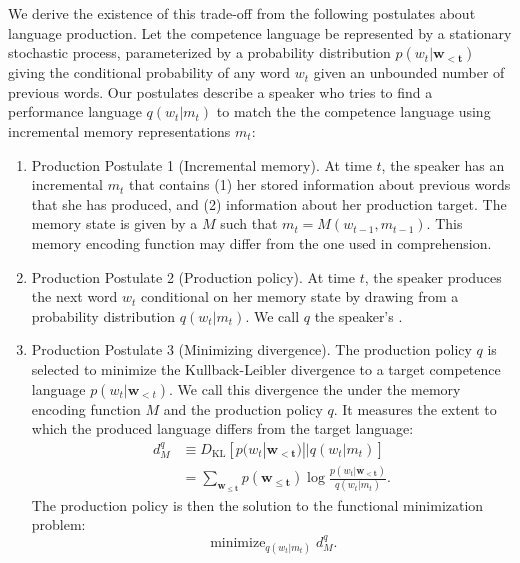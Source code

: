 
We derive the existence of this trade-off from the following postulates about language production. Let the competence language be represented by a stationary stochastic process, parameterized by a probability distribution $p(w_t | \mathbf{w_{<t}})$ giving the conditional probability of any word $w_t$ given an unbounded number of previous words. Our postulates describe a speaker who tries to find a performance language $q(w_t|m_t)$ to match the the competence language using incremental memory representations $m_t$:

\begin{enumerate}
    \item Production Postulate 1 (Incremental memory). At time $t$, the speaker has an incremental  $m_t$ that contains (1) her stored information about previous words that she has produced, and (2) information about her production target. The memory state is given by a  $M$ such that $m_t = M(w_{t-1}, m_{t-1})$. This memory encoding function may differ from the one used in comprehension.
    
    \item Production Postulate 2 (Production policy). At time $t$, the speaker produces the next word $w_t$ conditional on her memory state by drawing from a probability distribution $q(w_t | m_t)$. We call $q$ the speaker's .
    
    \item Production Postulate 3 (Minimizing divergence). The production policy $q$ is selected to minimize the Kullback-Leibler divergence to a target competence language $p(w_t|\mathbf{w}_{<t})$. We call this divergence the  under the memory encoding function $M$ and the production policy $q$. It measures the extent to which the produced language differs from the target language:
    \begin{align}
    \label{eq:comp-perf-div}
    d^q_M &\equiv D_{\text{KL}} [ p(w_t|\mathbf{w_{<t}}) || q(w_t|m_t) ] \\
        &= \sum_{\mathbf{w_{\le t}}} p(\mathbf{w_{\le t}}) \log \frac{p(w_t | \mathbf{w_{<t}})}{q(w_t|m_t)}.
    \end{align}
    The production policy is then the solution to the functional minimization problem:
    \begin{equation}
        \mathop{\text{minimize }}_{q(w_t|m_t)} d^q_M.
    \end{equation}
\end{enumerate}

